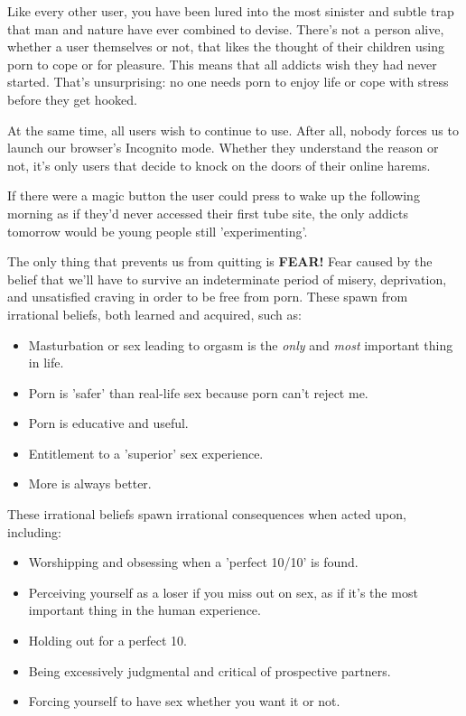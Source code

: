 \documentclass[
]{book}
\begin{document}
Like every other user, you have been lured into the most sinister and subtle trap that man and nature have ever combined to devise. There's not a person alive, whether a user themselves or not, that likes the thought of their children using porn to cope or for pleasure. This means that all addicts wish they had never started. That's unsurprising: no one needs porn to enjoy life or cope with stress before they get hooked.

At the same time, all users wish to continue to use. After all, nobody forces us to launch our browser's Incognito mode. Whether they understand the reason or not, it's only users that decide to knock on the doors of their online harems.

If there were a magic button the user could press to wake up the following morning as if they'd never accessed their first tube site, the only addicts tomorrow would be young people still 'experimenting'.

The only thing that prevents us from quitting is \textbf{FEAR!} Fear caused by the belief that we'll have to survive an indeterminate period of misery, deprivation, and unsatisfied craving in order to be free from porn. These spawn from irrational beliefs, both learned and acquired, such as:

\begin{itemize}
\item
  Masturbation or sex leading to orgasm is the \emph{only} and \emph{most} important thing in life.
\item
  Porn is 'safer' than real-life sex because porn can't reject me.
\item
  Porn is educative and useful.
\item
  Entitlement to a 'superior' sex experience.
\item
  More is always better.
\end{itemize}

These irrational beliefs spawn irrational consequences when acted upon, including:

\begin{itemize}
\item
  Worshipping and obsessing when a 'perfect 10/10' is found.
\item
  Perceiving yourself as a loser if you miss out on sex, as if it's the most important thing in the human experience.
\item
  Holding out for a perfect 10.
\item
  Being excessively judgmental and critical of prospective partners.
\item
  Forcing yourself to have sex whether you want it or not.
\end{itemize}
\end{document}
